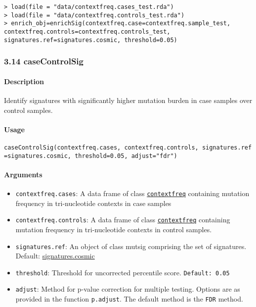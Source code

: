 \documentclass[]{article}
\providecommand{\tightlist}{%
  \setlength{\itemsep}{0pt}\setlength{\parskip}{0pt}}
\let\oldparagraph\paragraph
\renewcommand{\paragraph}[1]{\oldparagraph{#1}\mbox{}}
\begin{document}
\begin{verbatim}
> load(file = "data/contextfreq.cases_test.rda")
> load(file = "data/contextfreq.controls_test.rda")
> enrich_obj=enrichSig(contextfreq.case=contextfreq.sample_test, contextfreq.controls=contextfreq.controls_test, signatures.ref=signatures.cosmic, threshold=0.05)
\end{verbatim}

\subsubsection{3.14 caseControlSig}\label{casecontrolsig}

\paragraph{\texorpdfstring{\textbf{Description}}{Description}}\label{description-11}

Identify signatures with significantly higher mutation burden in case
samples over control samples.

\paragraph{\texorpdfstring{\textbf{Usage}}{Usage}}\label{usage-13}

\texttt{caseControlSig(contextfreq.cases,\ contextfreq.controls,\ signatures.ref=signatures.cosmic,\ threshold=0.05,\ adjust="fdr")}

\paragraph{\texorpdfstring{\textbf{Arguments
}}{Arguments }}\label{arguments-12}

\begin{itemize}
\tightlist
\item
  \texttt{contextfreq.cases}: A data frame of class
  \protect\hyperlink{contextfreq}{\texttt{contextfreq}} containing
  mutation frequency in tri-nucleotide contexts in case samples
\item
  \texttt{contextfreq.controls}: A data frame of class
  \protect\hyperlink{contextfreq}{\texttt{contextfreq}} containing
  mutation frequency in tri-nucleotide contexts in control samples.
\item
  \texttt{signatures.ref}: An object of class mutsig comprising the set
  of signatures. Default:
  \href{https://cran.r-project.org/web/packages/deconstructSigs/deconstructSigs.pdf}{signatures.cosmic}
\item
  \texttt{threshold}: Threshold for uncorrected percentile score.
  \texttt{Default:\ 0.05}
\item
  \texttt{adjust}: Method for p-value correction for multiple testing.
  Options are as provided in the function \texttt{p.adjust}. The default
  method is the \texttt{FDR} method.
\end{itemize}
\end{document}
